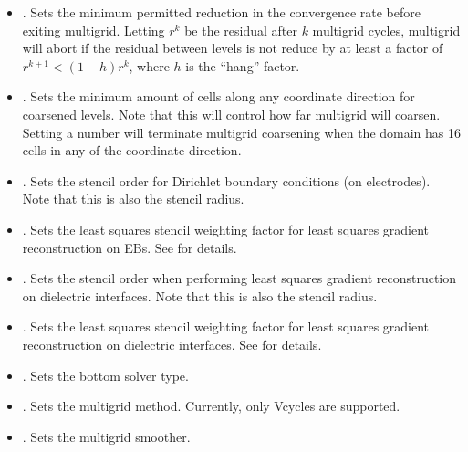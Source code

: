 \documentclass[letterpaper,10pt,english]{sphinxmanual}
\begin{document}
\begin{itemize}
\item {} 
.
Sets the minimum permitted reduction in the convergence rate before exiting multigrid.
Letting \(r^k\) be the residual after \(k\) multigrid cycles, multigrid will abort if the residual between levels is not reduce by at least a factor of \(r^{k+1} < (1-h)r^k\), where \(h\) is the “hang” factor.

\item {} 
.
Sets the minimum amount of cells along any coordinate direction for coarsened levels.
Note that this will control how far multigrid will coarsen. Setting a number  will terminate multigrid coarsening when the domain has 16 cells in any of the coordinate direction.

\item {} 
.
Sets the stencil order for Dirichlet boundary conditions (on electrodes).
Note that this is also the stencil radius.

\item {} 
. Sets the least squares stencil weighting factor for least squares gradient reconstruction on EBs.
See {\hyperref[\detokenize{Utilities/LeastSquares:chap-leastsquares}]{}} for details.

\item {} 
. Sets the stencil order when performing least squares gradient reconstruction on dielectric interfaces.
Note that this is also the stencil radius.

\item {} 
.
Sets the least squares stencil weighting factor for least squares gradient reconstruction on dielectric interfaces.
See {\hyperref[\detokenize{Utilities/LeastSquares:chap-leastsquares}]{}} for details.

\item {} 
.
Sets the bottom solver type.

\item {} 
.
Sets the multigrid method.
Currently, only V\sphinxhyphen{}cycles are supported.

\item {} 
.
Sets the multigrid smoother.

\end{itemize}
\end{document}
